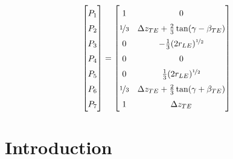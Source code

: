 \begin{equation}
\renewcommand\arraystretch{1.5}
\begin{bmatrix}
P_1 \\ 
P_2 \\
P_3 \\
P_4 \\
P_5 \\
P_6 \\
P_7
\end{bmatrix}
=
\begin{bmatrix}
1 & 0 \\ 
\nicefrac{1}{3} & \Delta z_{TE}+\frac{2}{3}\tan(\gamma-\beta_{TE})  \\ 
0 & -\frac{1}{3}(2r_{LE})^{\nicefrac{1}{2}} \\
0 & 0 \\
0 & \frac{1}{3} (2r_{LE})^{\nicefrac{1}{2}}\\
\nicefrac{1}{3} & \Delta z_{TE}+\frac{2}{3}\tan(\gamma+\beta_{TE}) \\
1 & \Delta z_{TE}
\end{bmatrix} 
\end{equation}



\section{Introduction}




\bigskip

 
{}

 
